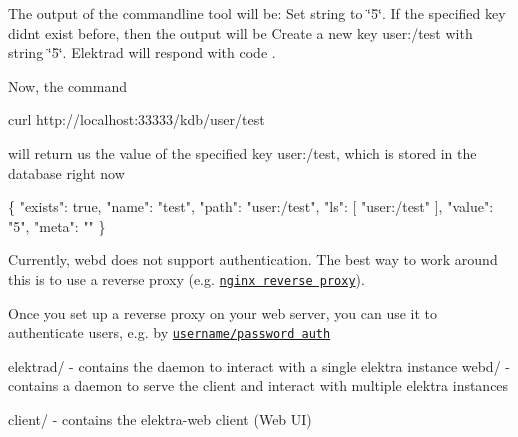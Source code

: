 The output of the commandline tool will be\+: {\ttfamily Set string to \char`\"{}5\char`\"{}}. If the specified key didn\textquotesingle{}t exist before, then the output will be {\ttfamily Create a new key user\+:/test with string \char`\"{}5\char`\"{}}. Elektrad will respond with code {}.

Now, the command


\begin{DoxyCode}
curl http://localhost:33333/kdb/user/test
\end{DoxyCode}


will return us the value of the specified key {\ttfamily user\+:/test}, which is stored in the database right now


\begin{DoxyCode}
\{
    "exists": true,
    "name": "test",
    "path": "user:/test",
    "ls": [
        "user:/test"
    ],
    "value": "5",
    "meta": ""
\}
\end{DoxyCode}


Currently, webd does not support authentication. The best way to work around this is to use a reverse proxy (e.\+g. \href{https://www.nginx.com/resources/admin-guide/reverse-proxy/}{\tt nginx reverse proxy}).

Once you set up a reverse proxy on your web server, you can use it to authenticate users, e.\+g. by \href{https://www.digitalocean.com/community/tutorials/how-to-set-up-password-authentication-with-nginx-on-ubuntu-14-04}{\tt username/password auth}

{\ttfamily elektrad/} -\/ contains the daemon to interact with a single elektra instance {\ttfamily webd/} -\/ contains a daemon to serve the client and interact with multiple elektra instances

{\ttfamily client/} -\/ contains the elektra-\/web client (Web UI)


